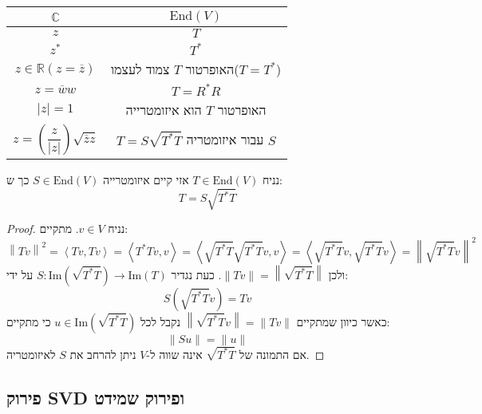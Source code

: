 \documentclass{tstextbook}
\begin{document}
\begin{table}[htbp]
  \centering
  \begin{tabular}{|cc|}
    \hline
    \(\mathbb{C}\) & \(\mathrm{End}(V)\) \\ \hline
    \(z\) & \(T\) \\ \hline
    \(z^{*}\) & \(T^{*}\) \\ \hline
    \(z \in \mathbb{R}\left( z=\overline{z} \right)\) & האופרטור \(T\) צמוד לעצמו(\(T=T^{*}\)) \\ \hline
    \(z=\overline{w}w\) & \(T=R^{*}R\) \\ \hline
    \(\lvert z \rvert=1\) & האופרטור \(T\) הוא איזומטרייה \\ \hline
    $$z = \left( \frac{z}{\lvert z \rvert } \right)\sqrt{ \overline{z} z }$$ & \(T=S\sqrt{ T^{*}T }\) עבור איזומטריה \(S\) \\ \hline
  \end{tabular}
\end{table}
\begin{theorem}
נניח \(T \in \mathrm{End}(V)\) אזי קיים איזומטרייה \(S \in \mathrm{End}(V)\) כך ש:
$$T=S\sqrt{ T^{*}T }$$

\end{theorem}
\begin{proof}
נניח \(v \in V\). מתקיים:
$$\left\|T v \right\|^{2}=\left\langle T v ,T v \right\rangle =\left\langle T^{\ast}T v , v \right\rangle=\left\langle\sqrt{T^{\ast}T}\sqrt{T^{\ast}T} v , v \right\rangle =\left\langle\sqrt{T^{\ast}T} v ,\sqrt{T^{\ast}T} v \right\rangle=\left\|\sqrt{T^{\ast}T} v \right\|^{2}$$
ולכן \(\lVert Tv \rVert=\left\lVert  \sqrt{ T^{*}T }  \right\rVert\). כעת נגדיר \(S:\mathrm{Im}\left( \sqrt{ T^{*}T } \right)\to \mathrm{Im}(T)\) על ידי:
$$S\left( \sqrt{ T^{*}T } v\right)=Tv$$
כאשר כיוון שמתקיים \(\left\lVert  \sqrt{ T^{*}T }v  \right\rVert=\lVert Tv \rVert\) נקבל לכל \(u \in \mathrm{Im}\left( \sqrt{ T^{*}T } \right)\) כי מתקיים:
$$\lVert Su \rVert =\lVert u \rVert $$
אם התמונה של \(\sqrt{ T^{*}T }\) אינה שווה ל-\(V\) ניתן להרחב את \(S\) לאיזומטריה.

\end{proof}
\subsection{פירוק SVD ופירוק שמידט}
\end{document}
